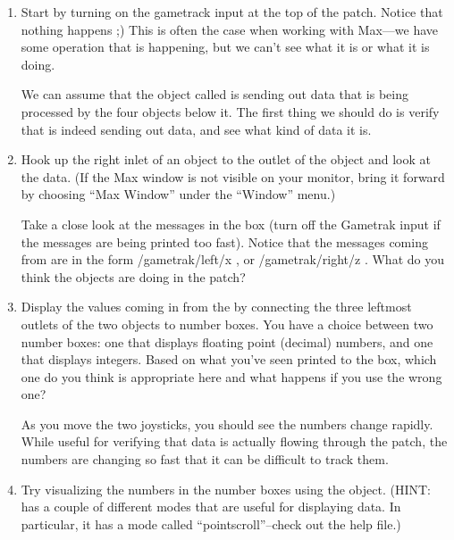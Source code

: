 \begin{enumerate}
\item Start by turning on the gametrack input at the top of the patch.  
Notice that nothing happens ;)  This is often the case when working with Max---we 
have some operation that is happening, but we can't see what it is or what it is doing.

We can assume that the object called  is sending out data that is being 
processed by the four  objects below it.  The first thing we should do is 
verify that  is indeed sending out data, and see what kind of data it is.  

\item Hook up the right inlet of an  object to the outlet of the  object and look at the data.
(If the Max window is not visible on your monitor, bring it forward by 
choosing ``Max Window'' under the ``Window'' menu.)


Take a close look at the messages in the  box (turn off the Gametrak input if the 
messages are being printed too fast).  Notice that the messages coming from  
are in the form /gametrak/left/x , or /gametrak/right/z .  
What do you think the  objects are doing in the patch?


\item Display the values coming in from the \gt{} by connecting the three leftmost outlets of the
two  objects to number boxes.
You have a choice between two number boxes:  one that displays floating point (decimal) 
numbers, and one that displays integers.  Based on what you've seen printed to the  box, 
which one do you think is appropriate here and what happens if you use the wrong one?


As you move the two joysticks, you should see the numbers change rapidly.  
While useful for verifying that data is actually flowing through the patch, 
the numbers are changing so fast that it can be difficult to track them.


\item Try visualizing the numbers in the number boxes using the  object.  
(HINT:   has a couple of different modes that are useful for displaying data.  
In particular, it has a mode called ``pointscroll''--check out the help file.)



\end{enumerate}





